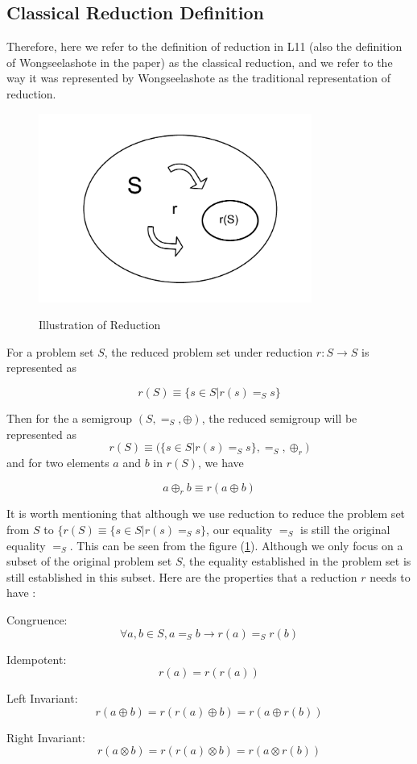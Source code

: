 \documentclass[a4paper,12pt,twoside,openright]{report}
\newcommand{\e}[2]{
\begin{equation}
  \label{#1} 
  #2
\end{equation}
}
\begin{document}
\subsection{Classical Reduction Definition}
Therefore, here we refer to the definition of reduction in L11 (also the definition of Wongseelashote in the paper) as the classical reduction, and we refer to the way it was represented by Wongseelashote as the traditional representation of reduction.
\begin{figure}[H]
\centering
\includegraphics[width=0.8\textwidth]{reduction.pdf}
\label{reduction}
\caption{Illustration of Reduction}
\end{figure}
For a problem set $S$, the reduced problem set under reduction $r: S \rightarrow S$ is represented as 
\e{r:def:traditional}{r(S) \equiv \{s \in S | r(s) =_S s\}}
Then for the a semigroup $(S,=_S,\oplus)$, the reduced semigroup will be represented as \e{r:def:semirgoup}{{r(S) \equiv (\{s \in S | r(s) =_S s\}},=_S,\oplus_r)} and for two elements $a$ and $b$  in $r(S)$, we have 
\e{r:def:binary_operator}{a \oplus_r b \equiv r(a \oplus b)}
It is worth mentioning that although we use reduction to reduce the problem set from $S$ to $\{r(S) \equiv \{s \in S | r(s) =_S s\}$, our equality $=_S$ is still the original equality $=_S$. 
This can be seen from the figure (\ref{reduction}). Although we only focus on a subset of the original problem set $S$, the equality established in the problem set is still established in this subset. 
Here are the properties that a reduction $r$ needs to have \cite{WONGSEELASHOTE197955} :

Congruence: \e{r:def:congruence}{\forall a,b \in S, a =_S b \rightarrow r(a) =_S r(b)}
Idempotent: \e{r:def:idempotent}{r(a) = r(r(a))} 
Left Invariant: \e{r:def:left_invariant}{r(a\oplus b) = r(r(a)\oplus b) = r(a\oplus r(b))}
Right Invariant: \e{r:def:right_invariant}{r(a\otimes b) = r(r(a)\otimes b) = r(a\otimes r(b))}
\end{document}
